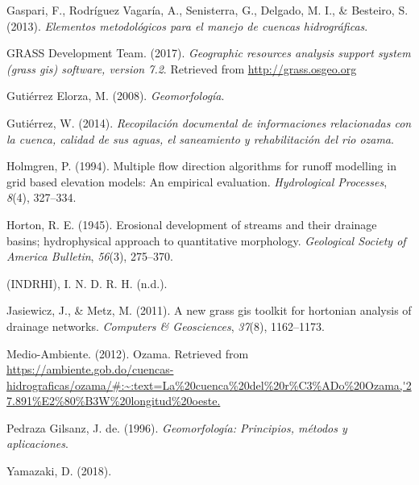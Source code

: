 \documentclass[11pt,]{article}
\begin{document}
\hypertarget{ref-gaspari2013elementos}{}
Gaspari, F., Rodríguez Vagaría, A., Senisterra, G., Delgado, M. I., \&
Besteiro, S. (2013). \emph{Elementos metodológicos para el manejo de
cuencas hidrográficas}.

\hypertarget{ref-GRASS_GIS_software}{}
GRASS Development Team. (2017). \emph{Geographic resources analysis
support system (grass gis) software, version 7.2}. Retrieved from
\url{http://grass.osgeo.org}

\hypertarget{ref-gutierrez2008geomorfologia}{}
Gutiérrez Elorza, M. (2008). \emph{Geomorfología}.

\hypertarget{ref-williamgutierrez2014}{}
Gutiérrez, W. (2014). \emph{Recopilación documental de informaciones
relacionadas con la cuenca, calidad de sus aguas, el saneamiento y
rehabilitación del rio ozama}.

\hypertarget{ref-holmgren1994multiple}{}
Holmgren, P. (1994). Multiple flow direction algorithms for runoff
modelling in grid based elevation models: An empirical evaluation.
\emph{Hydrological Processes}, \emph{8}(4), 327--334.

\hypertarget{ref-horton1945erosional}{}
Horton, R. E. (1945). Erosional development of streams and their
drainage basins; hydrophysical approach to quantitative morphology.
\emph{Geological Society of America Bulletin}, \emph{56}(3), 275--370.

\hypertarget{ref-institutonacionalderecursoshidraulicos}{}
(INDRHI), I. N. D. R. H. (n.d.).

\hypertarget{ref-jasiewicz2011new}{}
Jasiewicz, J., \& Metz, M. (2011). A new grass gis toolkit for hortonian
analysis of drainage networks. \emph{Computers \& Geosciences},
\emph{37}(8), 1162--1173.

\hypertarget{ref-medioambiente}{}
Medio-Ambiente. (2012). Ozama. Retrieved from
\url{https://ambiente.gob.do/cuencas-hidrograficas/ozama/\#:~:text=La\%20cuenca\%20del\%20r\%C3\%ADo\%20Ozama,'27.891\%E2\%80\%B3W\%20longitud\%20oeste.}

\hypertarget{ref-pedraza1996geomorfologia}{}
Pedraza Gilsanz, J. de. (1996). \emph{Geomorfología: Principios, métodos
y aplicaciones}.

\hypertarget{ref-daiyamazaki2018}{}
Yamazaki, D. (2018).




\newpage
\singlespacing 
\end{document}
